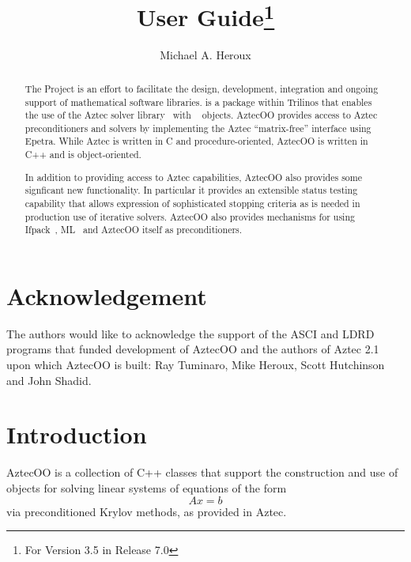 \documentclass[12pt,relax]{AztecOOUserGuide}
\title{\AztecOOTM{} User Guide\footnote{For \AztecOOTM{} Version 3.5 in \TrilinosTM{} Release
7.0}}
\author{Michael A. Heroux}
\date{} %
\begin{document}
\maketitle

\begin{abstract}

The \TrilinosTM{} Project is an effort to facilitate the design, development,
integration and ongoing support of mathematical software libraries.
\AztecOOTM{} is a package within Trilinos that enables the use of the Aztec solver
library~\cite{Aztec2.1} with \EpetraTM{}~\cite{Epetra-home-page} objects.
AztecOO provides access to Aztec preconditioners and solvers by
implementing the Aztec ``matrix-free'' interface using Epetra.
While Aztec is written in C and procedure-oriented,
AztecOO is written in C++ and is object-oriented.

In addition to providing access to Aztec capabilities, AztecOO also
provides some signficant new functionality.  In particular it provides
an extensible status testing capability that allows expression of
sophisticated stopping criteria as is needed in production use of
iterative solvers.  AztecOO also provides mechanisms for using
Ifpack~\cite{Ifpack-home-page}, ML~\cite{ML-home-page} and AztecOO
itself as preconditioners.
\end{abstract}


\section*{Acknowledgement}
The authors would like to acknowledge the support of the ASCI and LDRD
programs that funded development of AztecOO and the authors of Aztec
2.1 upon which AztecOO is built: Ray Tuminaro, Mike Heroux, Scott
Hutchinson and John Shadid.

\clearpage
\tableofcontents
\listoffigures

\clearpage

\section{Introduction}
\label{Section:Introduction}

AztecOO is a collection of C++ classes that support the construction
and use of objects for solving linear systems of equations of the form
\begin{equation}
\label{e:axb}
Ax = b
\end{equation}
via
preconditioned Krylov methods, as provided in Aztec.
\end{document}
